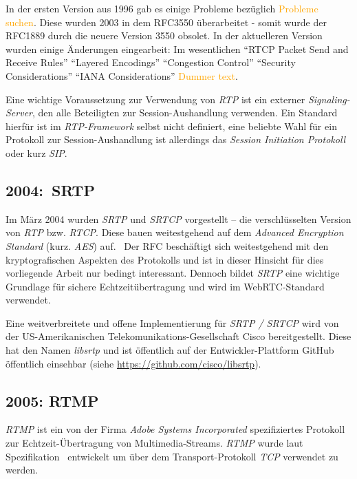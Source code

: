 \documentclass{article}
\begin{document}
\begin{onecolumn}
In der ersten Version aus 1996 gab es einige Probleme bezüglich
\textcolor{orange}{Probleme suchen}. Diese wurden 2003 in dem RFC3550
überarbeitet - somit wurde der RFC1889 durch die neuere Version 3550 obsolet.
In der aktuelleren Version wurden einige Änderungen eingearbeit: Im
wesentlichen ``RTCP Packet Send and Receive Rules'' ``Layered Encodings''
``Congestion Control'' ``Security Considerations'' ``IANA Considerations''
\textcolor{orange}{Dummer text}.

Eine wichtige Voraussetzung zur Verwendung von \textit{RTP} ist ein externer
\textit{Signaling-Server}, den alle Beteiligten zur Session-Aushandlung
verwenden. Ein Standard hierfür ist im \textit{RTP-Framework} selbst nicht
definiert, eine beliebte Wahl für ein Protokoll zur Session-Aushandlung ist
allerdings das \textit{Session Initiation Protokoll} oder kurz
\textit{SIP}.~\cite{RFC3550, RFC3261}

\subsection{2004:\ SRTP}

Im März 2004 wurden \textit{SRTP} und \textit{SRTCP} vorgestellt – die
verschlüsselten Version von \textit{RTP} bzw. \textit{RTCP}. Diese bauen
weitestgehend auf dem \textit{Advanced Encryption Standard} (kurz.
\textit{AES}) auf.~\cite{RFC3711} Der RFC beschäftigt sich weitestgehend mit
den kryptografischen Aspekten des Protokolls und ist in dieser Hinsicht für
dies vorliegende Arbeit nur bedingt interessant. Dennoch bildet
\textit{SRTP} eine wichtige Grundlage für sichere Echtzeitübertragung und
wird im WebRTC-Standard verwendet.

Eine weitverbreitete und offene Implementierung für \textit{SRTP / SRTCP}
wird von der US-Amerikanischen Telekomunikations-Gesellschaft Cisco
bereitgestellt. Diese hat den Namen \textit{libsrtp} und ist öffentlich auf der
Entwickler-Plattform GitHub öffentlich einsehbar (siehe
\url{https://github.com/cisco/libsrtp}).


\subsection{2005: RTMP}

\textit{RTMP} ist ein von der Firma \textit{Adobe Systems Incorporated}
spezifiziertes Protokoll zur Echtzeit-Übertragung von Multimedia-Streams.
\textit{RTMP} wurde laut Spezifikation~\cite{RTMPSpec} entwickelt um
über dem Transport-Protokoll \textit{TCP} verwendet zu werden.


\end{onecolumn}
\end{document}
